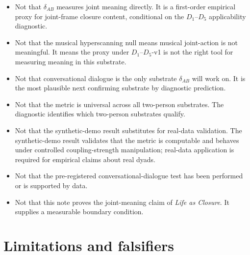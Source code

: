 \documentclass[11pt,a4paper]{article}
\begin{document}
\begin{itemize}\itemsep0pt
\item Not that $\delta_{AB}$ measures joint meaning directly. It is a first-order empirical proxy for joint-frame closure content, conditional on the $D_1$--$D_5$ applicability diagnostic.
\item Not that the musical hyperscanning null means musical joint-action is not meaningful. It means the proxy under $D_1$--$D_5$-v1 is not the right tool for measuring meaning in this substrate.
\item Not that conversational dialogue is the only substrate $\delta_{AB}$ will work on. It is the most plausible next confirming substrate by diagnostic prediction.
\item Not that the metric is universal across all two-person substrates. The diagnostic identifies which two-person substrates qualify.
\item Not that the synthetic-demo result substitutes for real-data validation. The synthetic-demo result validates that the metric is computable and behaves under controlled coupling-strength manipulation; real-data application is required for empirical claims about real dyads.
\item Not that the pre-registered conversational-dialogue test has been performed or is supported by data.
\item Not that this note proves the joint-meaning claim of \emph{Life as Closure}. It supplies a measurable boundary condition.
\end{itemize}

\section{Limitations and falsifiers}\label{sec:limits}
\end{document}
